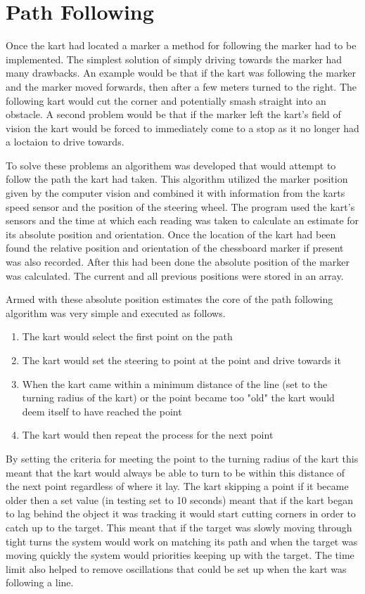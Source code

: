 \section{Path Following}
Once the kart had located a marker a method for following the marker had to be implemented. The simplest solution of simply driving towards the marker had many drawbacks. An example would be that if the kart was following the marker and the marker moved forwards, then after a few meters turned to the right. The following kart would cut the corner and potentially smash straight into an obstacle. A second problem would be that if the marker left the kart’s field of vision the kart would be forced to immediately come to a stop as it no longer had a loctaion to drive towards.

To solve these problems an algorithem was developed that would attempt to follow the path the kart had taken. This algorithm utilized the marker position given by the computer vision and combined it with information from the karts speed sensor and the position of the steering wheel. The program used the kart’s sensors and the time at which each reading was taken to calculate an estimate for its absolute position and orientation. Once the location of the kart had been found the relative position and orientation of the chessboard marker if present was also recorded. After this had been done the absolute position of the marker was calculated. The current and all previous positions were stored in an array.

Armed with these absolute position estimates the core of the path following algorithm was very simple and executed as follows. 
\begin{enumerate}
\item The kart would select the first point on the path
\item The kart would set the steering to point at the point and drive towards it
\item When the kart came within a minimum distance of the line (set to the turning radius of the kart)  or the point became too "old" the kart would deem itself to have reached the point
\item The kart would then repeat the process for the next point
\end{enumerate}

By setting the criteria for meeting the point to the turning radius of the kart this meant that the kart would always be able to turn to be within this distance  of the next point regardless of where it lay. The kart skipping a point if it became older then a set value (in testing set to 10 seconds) meant that if the kart began to lag behind the object it was tracking it would start cutting corners in order to catch up to the target. This meant that if the target was slowly moving through tight turns the system would work on matching its path and when the target was moving quickly the system would priorities keeping up with the target. The time limit also helped to remove oscillations that could be set up when the kart was following a line.

